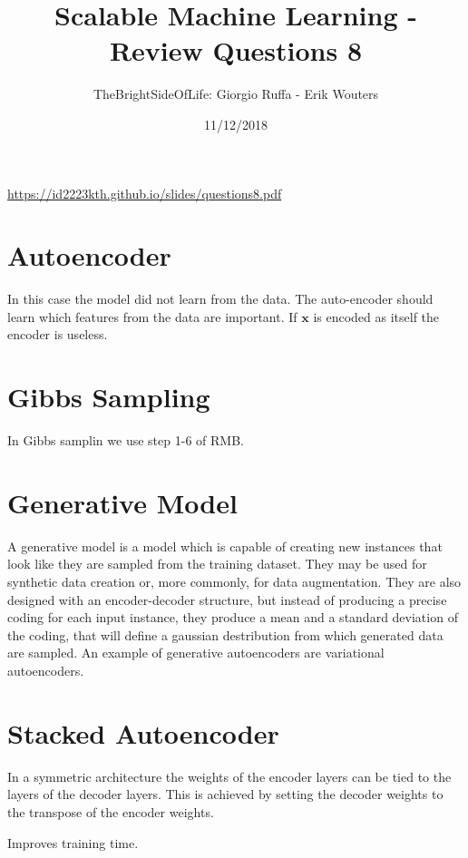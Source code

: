 \documentclass[a4paper]{article}
\title{Scalable Machine Learning - Review Questions 8}
\author{TheBrightSideOfLife: Giorgio Ruffa - Erik Wouters}
\date{11/12/2018}
\begin{document}
\maketitle

\url{https://id2223kth.github.io/slides/questions8.pdf}

\section{Autoencoder}
In this case the model did not learn from the data. The auto-encoder should learn which features from the data are important. If $\mathbf{x}$ is encoded as itself the encoder is useless.

\section{Gibbs Sampling}
In Gibbs samplin we use step 1-6 of RMB.

\section{Generative Model}
A generative model is a model which is capable of creating new instances that look like they are sampled from the training dataset. They may be used for synthetic data creation or, more commonly, for data augmentation. They are also designed with an encoder-decoder structure, but instead of producing a precise coding for each input instance, they produce a mean and a standard deviation of the coding, that will define a gaussian destribution from which generated data are sampled. An example of generative autoencoders are variational autoencoders. 

\section{Stacked Autoencoder}
In a symmetric architecture the weights of the encoder layers can be tied to the layers of the decoder layers. This is achieved by setting the decoder weights to the transpose of the encoder weights.

Improves training time.


% 
\end{document}
